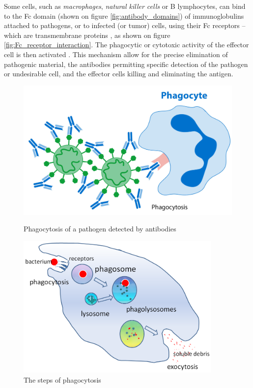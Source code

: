 Some cells, such as \emph{macrophages}, \emph{natural killer cells} or B lymphocytes, 
can bind to the Fc domain (shown on figure \ref{fig:antibody_domains})
of immunoglobulins attached to pathogens, or to infected (or tumor) cells,
using their Fc receptors -- which are transmembrane proteins \cite{fridman_fc_1991}, 
as shown on figure \ref{fig:Fc_receptor_interaction}. 
The phagocytic or cytotoxic activity of the effector cell is then
activated \cite{tay_antibody-dependent_2019}.
This mechanism allow for the precise elimination of pathogenic material, the antibodies
permitting specific detection of the pathogen or undesirable cell, and the effector cells
killing and eliminating the antigen.

\begin{figure}[H]
    \begin{minipage}{0.49\textwidth}
        \centering
        \includegraphics[width=\textwidth]{../Images/phagocytosis.png}   
        \caption{Phagocytosis of a pathogen detected by antibodies}
        \label{fig:phagocytosis}
    \end{minipage}\hfill
    \begin{minipage}{0.49\textwidth}
        \centering
        \includegraphics[width=0.9\textwidth]{../Images/phagocytosis_steps.png}   
        \caption{The steps of phagocytosis}
        \label{fig:phagocytosis_steps}
    \end{minipage}
\end{figure}

